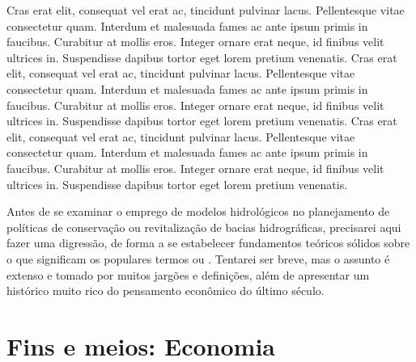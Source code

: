 \documentclass[./main.tex]{subfiles}
\begin{document}
\par Cras erat elit, consequat vel erat ac, tincidunt pulvinar lacus. Pellentesque vitae consectetur quam. Interdum et malesuada fames ac ante ipsum primis in faucibus. Curabitur at mollis eros. Integer ornare erat neque, id finibus velit ultrices in. Suspendisse dapibus tortor eget lorem pretium venenatis. Cras erat elit, consequat vel erat ac, tincidunt pulvinar lacus. Pellentesque vitae consectetur quam. Interdum et malesuada fames ac ante ipsum primis in faucibus. Curabitur at mollis eros. Integer ornare erat neque, id finibus velit ultrices in. Suspendisse dapibus tortor eget lorem pretium venenatis. Cras erat elit, consequat vel erat ac, tincidunt pulvinar lacus. Pellentesque vitae consectetur quam. Interdum et malesuada fames ac ante ipsum primis in faucibus. Curabitur at mollis eros. Integer ornare erat neque, id finibus velit ultrices in. Suspendisse dapibus tortor eget lorem pretium venenatis.

\par Antes de se examinar o emprego de modelos hidrológicos no planejamento de políticas de conservação ou revitalização de bacias hidrográficas, precisarei aqui fazer uma digressão, de forma a se estabelecer fundamentos teóricos sólidos sobre o que significam os populares termos ou . Tentarei ser breve, mas o assunto é extenso e tomado por muitos jargões e definições, além de apresentar um histórico muito rico do pensamento econômico do último século. 

\section{Fins e meios: Economia} \label{chap:ecoeco:economy}
\end{document}
